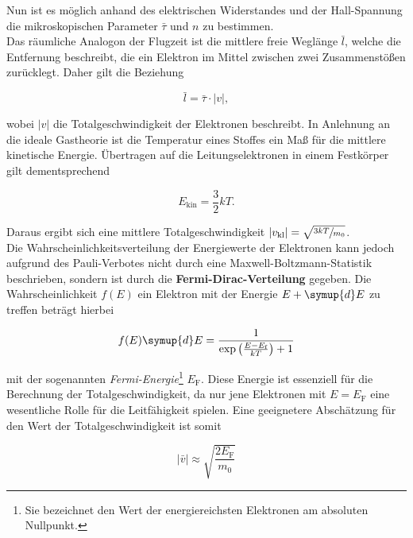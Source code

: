 \noindent Nun ist es möglich anhand des elektrischen Widerstandes und der Hall-Spannung die 
mikroskopischen Parameter $\bar{\tau}$ und $n$ zu bestimmen.\\

\noindent Das räumliche Analogon der Flugzeit ist die mittlere freie Weglänge $\bar{l}$, welche die Entfernung beschreibt, die ein 
Elektron im Mittel zwischen zwei Zusammenstößen zurücklegt.
Daher gilt die Beziehung

\begin{equation}
\label{eqn:Weglaenge}
    \bar{l} = \bar{\tau}\cdot|v|,
\end{equation}

\noindent wobei $|v|$ die Totalgeschwindigkeit der Elektronen beschreibt. In Anlehnung an die ideale 
Gastheorie ist die Temperatur eines Stoffes ein Maß für die mittlere kinetische Energie. Übertragen auf die 
Leitungselektronen in einem Festkörper gilt dementsprechend

\begin{equation*}
    E_\text{kin} = \frac{3}{2}kT.
\end{equation*}

\noindent Daraus ergibt sich eine mittlere Totalgeschwindigkeit $|v_\text{kl}| = \sqrt{\sfrac{3kT}{m_0}}$.\\

\noindent Die Wahrscheinlichkeitsverteilung der Energiewerte der Elektronen kann jedoch aufgrund des Pauli-Verbotes
nicht durch eine Maxwell-Boltzmann-Statistik beschrieben, sondern ist durch die \textbf{Fermi-Dirac-Verteilung} 
gegeben. Die Wahrscheinlichkeit $f(E)$ ein Elektron mit der Energie $E + \symup{d}E$ zu treffen 
beträgt hierbei 

\begin{equation*}
    f(E)\symup{d}E = \frac{1}{\exp{\left(\frac{E-E_\text{f}}{kT}\right)}+1}
\end{equation*}

\noindent mit der sogenannten \emph{Fermi-Energie}\footnote{Sie bezeichnet den Wert der energiereichsten Elektronen
am absoluten Nullpunkt.} $E_\text{F}$. Diese Energie ist essenziell für die Berechnung der Totalgeschwindigkeit, da nur jene 
Elektronen mit $E = E_\text{F}$ eine wesentliche Rolle für die Leitfähigkeit spielen. Eine geeignetere Abschätzung für 
den Wert der Totalgeschwindigkeit ist somit 

\begin{equation*}
    |\bar{v}| \approx \sqrt{\frac{2E_\text{F}}{m_0}}
\end{equation*}

